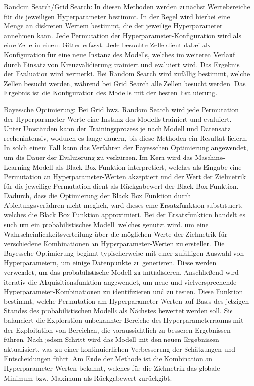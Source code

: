 \begin{description}
    \item Random Search/Grid Search: In diesen Methoden werden zunächst Wertebereiche für die jeweiligen Hyperparameter bestimmt. In der Regel wird hierbei eine Menge an diskreten Wertem bestimmt, die der jeweilige Hyperparameter annehmen kann. Jede Permutation der Hyperparameter-Konfiguration wird als eine Zelle in einem Gitter erfasst. 
    Jede besuchte Zelle dient dabei als Konfiguration für eine neue Instanz des Modells, welches im weiteren Verlauf durch Einsatz von Kreuzvalidierung trainiert und evaluiert wird. Das Ergebnis der Evaluation wird vermerkt.
    Bei Random Search wird zufällig bestimmt, welche Zellen besucht werden, während bei Grid Search alle Zellen besucht werden. Das Ergebnis ist die Konfiguration des Modells mit der besten Evaluierung.
    
    \item Bayessche Optimierung: Bei Grid bwz. Random Search wird jede Permutation der Hyperparameter-Werte eine Instanz des Modells trainiert und evaluiert. Unter Umständen kann der Trainingsprozess je nach Modell und Datensatz rechenintensiv, wodurch es lange dauern, bis diese Methoden ein Resultat liefern.
    In solch einem Fall kann das Verfahren der Bayesschen Optimierung angewendet, um die Dauer der Evaluierung zu verkürzen. Im Kern wird das Maschine-Learning Modell als Black Box Funktion interpretiert, welches als Eingabe eine Permutation an Hyperparameter-Werten akzeptiert und der Wert der Zielmetrik für die jeweilige Permutation dient als Rückgabewert der Black Box Funktion.
    Dadurch, dass die Optimierung der Black Box Funktion durch Ableitungsverfahren nicht möglich, wird dieses eine Ersatzfunktion substituiert, welches die Black Box Funktion approximiert.
    Bei der Ersatzfunktion handelt es such um ein probabilistisches Modell, welches genutzt wird, um eine Wahrscheinlichkeitsverteilung über die möglichen Werte der Zielmetrik für verschiedene Kombinationen an Hyperparameter-Werten zu erstellen.
    Die Bayessche Optimierung beginnt typischerweise mit einer zufälligen Auswahl von Hyperparametern, um einige Datenpunkte zu generieren. Diese werden verwendet, um das probabilistische Modell zu initialisieren. Anschließend wird iterativ die Akquisitionsfunktion angewendet, um neue und vielversprechende Hyperparameter-Kombinationen zu identifizieren und zu testen. 
    Diese Funktion bestimmt, welche Permutation am Hyperparameter-Werten auf Basis des jetzigen Standes des probabilistischen Modells als Nächstes bewertet werden soll. 
    Sie balanciert die Exploration unbekannter Bereiche des Hyperparameterraums mit der Exploitation von Bereichen, die voraussichtlich zu besseren Ergebnissen führen.
    Nach jedem Schritt wird das Modell mit den neuen Ergebnissen aktualisiert, was zu einer kontinuierlichen Verbesserung der Schätzungen und Entscheidungen führt. Am Ende der Methode ist die Kombination an Hyperparameter-Werten bekannt, welches für die Zielmetrik das globale Minimum bzw. Maximum als Rückgabewert zurückgibt.


\end{description}
